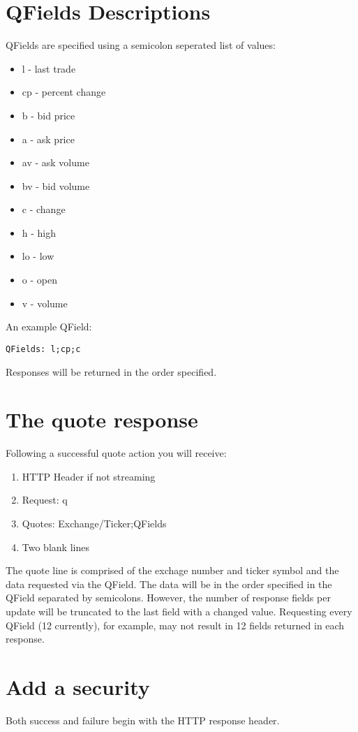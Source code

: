 \documentclass[12pt,twoside,letterpaper]{report}
\begin{document}
\section*{QFields Descriptions}
QFields are specified using a semicolon seperated list of values:
\begin{itemize}
\item l - last trade
\item cp - percent change
\item b - bid price
\item a - ask price
\item av - ask volume
\item bv - bid volume
\item c - change
\item h - high
\item lo - low
\item o - open
\item v - volume
\end{itemize}

An example QField:
\begin{verbatim}
QFields: l;cp;c
\end{verbatim} 

Responses will be returned in the order specified.

\section*{The quote response}
Following a successful quote action you will receive:

\begin{enumerate}
\item HTTP Header if not streaming
\item Request: q
\item Quotes: Exchange/Ticker;QFields
\item Two blank lines
\end{enumerate}

The quote line is comprised of the exchage number and ticker symbol and the data requested via the QField. The data will be in the order specified in the QField separated by semicolons. However, the number of response fields per update will be truncated to the last field with a changed value. Requesting every QField (12 currently), for example, may not result in 12 fields returned in each response.

\section*{Add a security}
Both success and failure begin with the HTTP response header.
\end{document}
